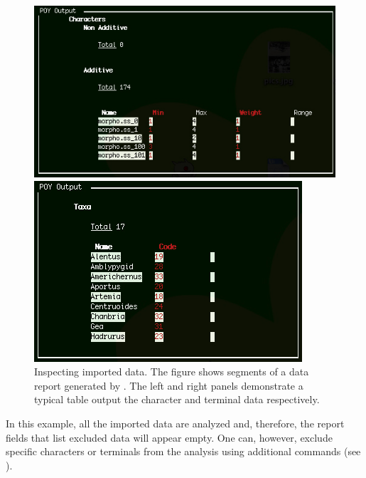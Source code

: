\begin{figure}
\centering
\begin{minipage}[c]{0.52\textwidth}
   		\includegraphics[width=\textwidth]{figures/report2.jpg}
\end{minipage}
\quad
\begin{minipage}[c]{0.44\textwidth}
	   	\includegraphics[width=\textwidth]{figures/report3.jpg}
   	\end{minipage}
\caption{Inspecting imported data. The figure shows segments of a data report generated by . The left and right panels demonstrate a typical table output the character and terminal data respectively.}
\label{fig:reportdata}
\end{figure}

In this example, all the imported data are analyzed and, therefore, the report fields that list excluded data will appear empty. One can, however, exclude specific characters or terminals from the analysis using additional commands (see ).

